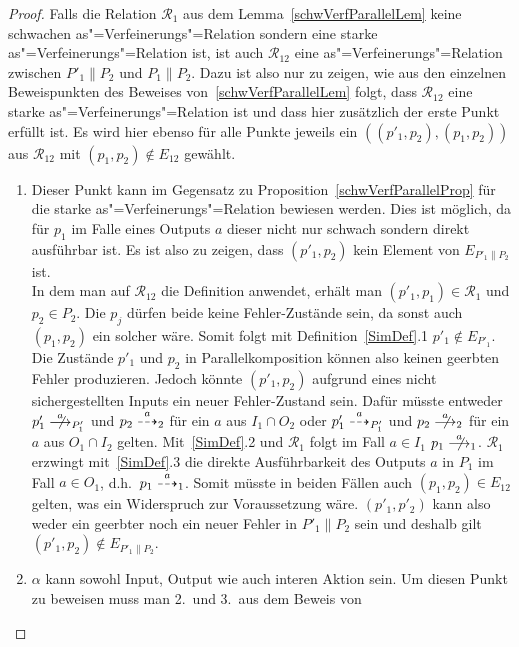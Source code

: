 \begin{proof}
  Falls die Relation $\mathcal{R}_1$ aus dem Lemma~\ref{schwVerfParallelLem}
  keine schwachen as"=Verfeinerungs"=Relation sondern eine starke
  as"=Verfeinerungs"=Relation ist, ist auch $\mathcal{R}_{12}$ eine
  as"=Verfeinerungs"=Relation zwischen $P'_1\|P_2$ und $P_1\|P_2$. Dazu ist
  also nur zu zeigen, wie aus den einzelnen Beweispunkten des Beweises
  von~\ref{schwVerfParallelLem} folgt, dass $\mathcal{R}_{12}$ eine starke
  as"=Verfeinerungs"=Relation ist und dass hier zusätzlich der erste Punkt
  erfüllt ist. Es wird hier ebenso für alle Punkte jeweils ein
  $((p'_1,p_2),(p_1,p_2))$ aus $\mathcal{R}_{12}$ mit $(p_1,p_2)\notin E_{12}$
  gewählt.
  \begin{enumerate}
    \item Dieser Punkt kann im Gegensatz zu
      Proposition~\ref{schwVerfParallelProp} für die starke
      as"=Verfeinerungs"=Relation bewiesen werden. Dies ist möglich, da für
      $p_1$ im Falle eines Outputs $a$ dieser nicht nur schwach sondern direkt
      ausführbar ist. Es ist also zu zeigen, dass $(p'_1,p_2)$ kein Element von
      $E_{P'_1\|P_2}$ ist.\\
      In dem man auf $\mathcal{R}_{12}$ die Definition anwendet, erhält man
      $(p'_1,p_1)\in\mathcal{R}_1$ und $p_2\in P_2$. Die $p_j$ dürfen beide
      keine Fehler-Zustände sein, da sonst auch $(p_1,p_2)$ ein solcher wäre.
      Somit folgt mit Definition~\ref{SimDef}.1 $p'_1\notin E_{P'_1}$. Die
      Zustände $p'_1$ und $p_2$ in Parallelkomposition können also keinen
      geerbten Fehler produzieren. Jedoch könnte $(p'_1,p_2)$ aufgrund eines
      nicht sichergestellten Inputs ein neuer Fehler-Zustand sein. Dafür müsste
      entweder $p'_1 \nmust[a]_{P'_1}$ und $p_2\may[a]_2$ für ein $a$ aus
      $I_1\cap O_2$ oder $p'_1\may[a]_{P'_1}$ und $p_2\nmust[a]_2$ für ein $a$
      aus $O_1\cap I_2$ gelten. Mit~\ref{SimDef}.2 und $\mathcal{R}_1$ folgt im
      Fall $a\in I_1$ $p_1 \nmust[a]_1$. $\mathcal{R}_1$ erzwingt
      mit~\ref{SimDef}.3 die direkte Ausführbarkeit des Outputs $a$ in $P_1$ im
      Fall $a\in O_1$, d.h.\ $p_1 \may[a]_1$. Somit müsste in beiden Fällen
      auch $(p_1,p_2)\in E_{12}$ gelten, was ein Widerspruch zur Voraussetzung
      wäre. $(p'_1,p'_2)$ kann also weder ein geerbter noch ein neuer Fehler in
      $P'_1\|P_2$ sein und deshalb gilt $(p'_1,p_2) \notin E_{P'_1\|P_2}$.
    \item $\alpha$ kann sowohl Input, Output wie auch interen Aktion sein. Um
      diesen Punkt zu beweisen muss man 2.\ und 3.\ aus dem Beweis von

\end{enumerate}
\end{proof}
